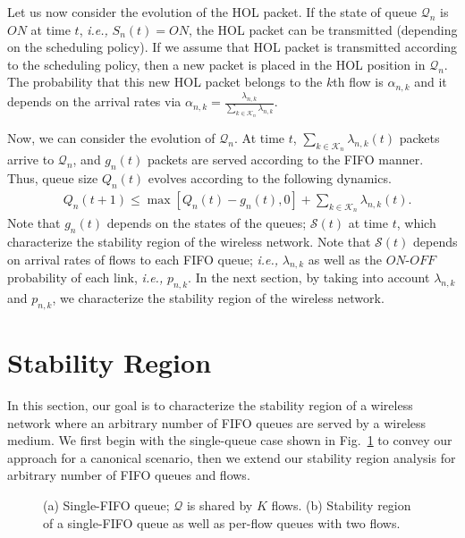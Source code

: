 \documentclass[conference]{IEEEtran}
\newcommand{\ie}{{\em i.e., }}
\newcommand{\Sset}{\mathcal{S}}
\newcommand{\Kset}{\mathcal{K}}
\newcommand{\Qset}{\mathcal{Q}}
\begin{document}
Let us now consider the evolution of the HOL packet. If the state of queue $\Qset_{n}$ is $ON$ at time $t$, \ie $S_{n}(t)=ON$, the HOL packet can be transmitted (depending on the scheduling policy). If we assume that HOL packet is transmitted according to the scheduling policy, then a new packet is placed in the HOL position in $\Qset_{n}$. The probability that this new HOL packet belongs to the $k$th flow is $\alpha_{n,k}$ and it depends on the arrival rates via $\alpha_{n,k} = \frac{\lambda_{n,k}}{\sum_{k \in \Kset_{n}} \lambda_{n,k}}$.

Now, we can consider the evolution of $\Qset_{n}$. At time $t$, $\sum_{k \in \Kset_{n}} \lambda_{n,k}(t)$ packets arrive to $\Qset_{n}$, and $g_{n}(t)$ packets are served according to the FIFO manner. Thus, queue size $Q_{n}(t)$ evolves according to the following dynamics.
\begin{align} \label{eq:queue_Qn}
& Q_{n}(t+1) \leq \max [Q_{n}(t) - g_{n}(t), 0] + \sum_{k \in \Kset_{n}} \lambda_{n,k}(t).
\end{align} 
Note that $g_{n}(t)$ depends on the states of the queues; $\Sset(t)$ at time $t$, which characterize the stability region of the wireless network.  Note that $\Sset(t)$ depends on arrival rates of flows to each FIFO queue; \ie $\lambda_{n,k}$ as well as the $ON$-$OFF$ probability of each link, \ie $p_{n,k}$. In the next section, by taking into account $\lambda_{n,k}$ and $p_{n,k}$, we characterize the stability region of the wireless network.


\section{Stability Region} \label{sec:stability_region}
In this section, our goal is to characterize the stability region of a wireless network where an arbitrary number of FIFO queues are served by a wireless medium. We first begin with the single-queue case shown in Fig.~\ref{fig:FIFO_one_queue_fig} to convey our approach for a canonical scenario, then we extend our stability region analysis for arbitrary number of FIFO queues and flows.

\begin{figure}
\centering
{} \hspace{5pt}
\vspace{-10pt}
\caption{(a) Single-FIFO queue; $\Qset$ is shared by $K$ flows. (b) Stability region of a single-FIFO queue as well as per-flow queues with two flows.}
\label{fig:FIFO_one_queue_fig}
\vspace{-5pt}
\end{figure}
\end{document}

